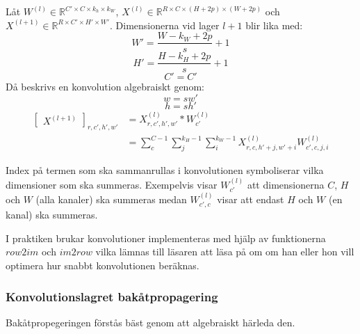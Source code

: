 \documentclass[a4paper,11pt,twoside]{article}
\begin{document}
Låt $W^{(l)} \in \mathbb{R}^{C' \times C  \times k_h \times k_W}$, $X^{(l)} \in \mathbb{R}^{R \times C  \times (H+2p) \times (W+2p)}$ och $X^{(l+1)} \in \mathbb{R}^{R \times C'  \times H' \times W'}$. Dimensionerna vid lager $l+1$ blir lika med:
\begin{equation}
W' = \frac{W-k_W+2p}{s} +1
\end{equation}
\begin{equation}
H' = \frac{H-k_H+2p}{s} +1
\end{equation}
\begin{equation}
C' = C'
\end{equation}
Då beskrivs en konvolution algebraiskt genom:
\begin{equation}
w = sw'
\end{equation}
\begin{equation}
h = sh'
\end{equation}
\begin{equation}\label{konvolution}
\begin{split}
	\begin{bmatrix} X^{(l+1)} \end{bmatrix}_{r, c', h', w'}	
		& = X^{(l)}_{r, c', h', w'} *W^{(l)}_{c'} \\
		& = \sum^{C-1}_{c} \sum^{k_H-1}_{j} \sum^{k_W-1}_{i} X^{(l)}_{r, c, h'+j, w'+i}W^{(l)}_{c', c, j, i}
\end{split}
\end{equation}

Index på termen som ska sammanrullas i konvolutionen symboliserar vilka dimensioner som ska summeras. Exempelvis visar $W^{(l)}_{c'}$ att dimensionerna $C$, $H$ och $W$ (alla kanaler) ska summeras medan  $W^{(l)}_{c', c}$ visar att endast $H$ och $W$ (en kanal) ska summeras.

I praktiken brukar konvolutioner implementeras med hjälp av funktionerna $row2im$ och $im2row$ vilka lämnas till läsaren att läsa på om om han eller hon vill optimera hur snabbt konvolutionen beräknas.

\subsubsection{Konvolutionslagret bakåtpropagering}
Bakåtpropegeringen förstås bäst genom att algebraiskt härleda den. 
\end{document}
